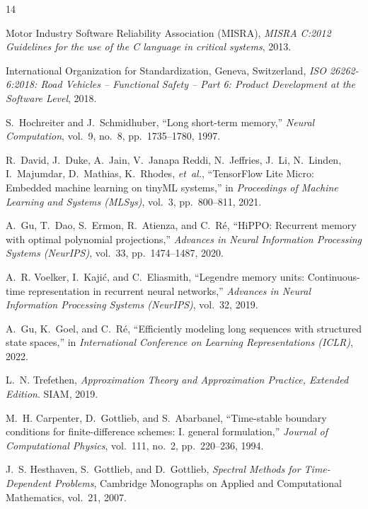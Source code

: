 \documentclass[10pt,twocolumn,a4paper]{article}
\theoremstyle{plain}
\theoremstyle{definition}
\begin{document}
\begin{thebibliography}{14}

Motor Industry Software Reliability Association (MISRA), \emph{MISRA C:2012 Guidelines for the use of the C language in critical systems}, 2013.

International Organization for Standardization, Geneva, Switzerland, \emph{ISO 26262-6:2018: Road Vehicles -- Functional Safety -- Part 6: Product Development at the Software Level}, 2018.

S.~Hochreiter and J.~Schmidhuber, ``Long short-term memory,'' \emph{Neural Computation}, vol.~9, no.~8, pp.~1735--1780, 1997.

R.~David, J.~Duke, A.~Jain, V.~Janapa Reddi, N.~Jeffries, J.~Li, N.~Linden, I.~Majumdar, D.~Mathias, K.~Rhodes, \emph{et~al.}, ``TensorFlow Lite Micro: Embedded machine learning on tinyML systems,'' in \emph{Proceedings of Machine Learning and Systems (MLSys)}, vol.~3, pp.~800--811, 2021.

A.~Gu, T.~Dao, S.~Ermon, R.~Atienza, and C.~R\'e, ``HiPPO: Recurrent memory with optimal polynomial projections,'' \emph{Advances in Neural Information Processing Systems (NeurIPS)}, vol.~33, pp.~1474--1487, 2020.

A.~R. Voelker, I.~Kaji\'c, and C.~Eliasmith, ``Legendre memory units: Continuous-time representation in recurrent neural networks,'' \emph{Advances in Neural Information Processing Systems (NeurIPS)}, vol.~32, 2019.

A.~Gu, K.~Goel, and C.~R\'e, ``Efficiently modeling long sequences with structured state spaces,'' in \emph{International Conference on Learning Representations (ICLR)}, 2022.

L.~N. Trefethen, \emph{Approximation Theory and Approximation Practice, Extended Edition}. SIAM, 2019.

M.~H. Carpenter, D.~Gottlieb, and S.~Abarbanel, ``Time-stable boundary conditions for finite-difference schemes: I. general formulation,'' \emph{Journal of Computational Physics}, vol.~111, no.~2, pp.~220--236, 1994.

J.~S. Hesthaven, S.~Gottlieb, and D.~Gottlieb, \emph{Spectral Methods for Time-Dependent Problems}, Cambridge Monographs on Applied and Computational Mathematics, vol.~21, 2007.


\end{thebibliography}
\end{document}
